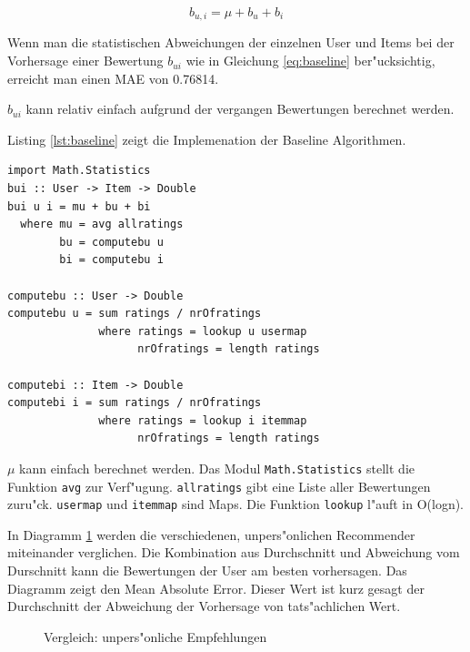 \documentclass[a4paper, 12pt]{article}
\begin{document}
\begin{equation}
  \label{eq:baseline}
  b_{u,i} = \mu + b_u + b_i
\end{equation}

Wenn man die statistischen Abweichungen der einzelnen User und Items bei der Vorhersage einer Bewertung $b_{ui}$ wie in Gleichung \ref{eq:baseline} ber"ucksichtig, erreicht man einen MAE von 0.76814.

$b_{ui}$ kann relativ einfach aufgrund der vergangen Bewertungen berechnet werden.

Listing \ref{lst:baseline} zeigt die Implemenation der Baseline Algorithmen.

\begin{lstlisting}[caption=Baseline predictor, label=lst:baseline]
import Math.Statistics
bui :: User -> Item -> Double
bui u i = mu + bu + bi
  where mu = avg allratings
        bu = computebu u
        bi = computebu i

computebu :: User -> Double
computebu u = sum ratings / nrOfratings
              where ratings = lookup u usermap
                    nrOfratings = length ratings

computebi :: Item -> Double
computebi i = sum ratings / nrOfratings
              where ratings = lookup i itemmap
                    nrOfratings = length ratings
\end{lstlisting}

$\mu$ kann einfach berechnet werden. Das Modul \verb|Math.Statistics| stellt die Funktion \verb|avg| zur Verf"ugung. \verb|allratings| gibt eine Liste aller Bewertungen zuru"ck. \verb|usermap| und \verb|itemmap| sind Maps. Die Funktion \verb|lookup| l"auft in O(logn).

In Diagramm \ref{fig:maebaselines} werden die verschiedenen, unpers"onlichen Recommender miteinander verglichen. Die Kombination aus Durchschnitt und Abweichung vom Durschnitt kann die Bewertungen der User am besten vorhersagen. Das Diagramm zeigt den Mean Absolute Error. Dieser Wert ist kurz gesagt der Durchschnitt der Abweichung der Vorhersage von tats"achlichen Wert.

\begin{figure}
  \centering
{}
  
  \caption{Vergleich: unpers"onliche Empfehlungen}
  \label{fig:maebaselines}
\end{figure}
\end{document}
